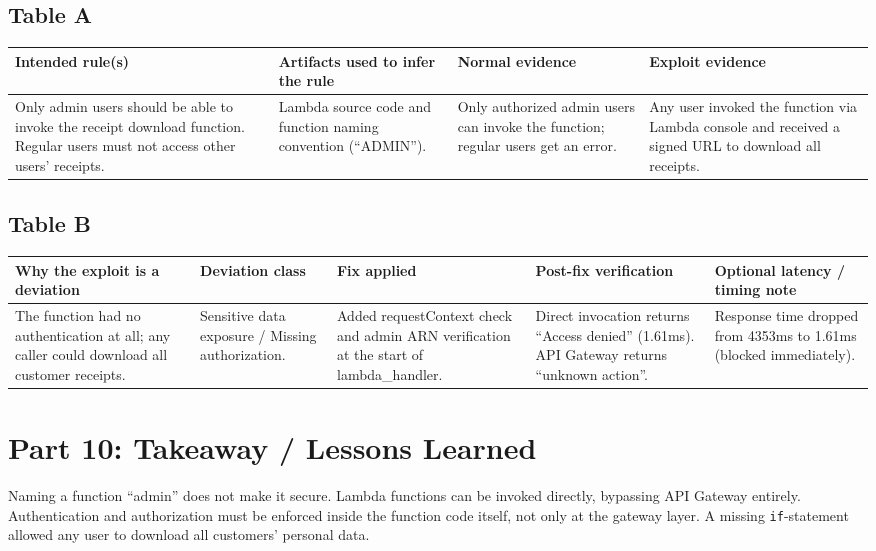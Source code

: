 \documentclass[12pt]{report}
\begin{document}
\subsection*{Table A}
\begin{table}[H]
  \small\centering
  \begin{tabularx}{\textwidth}{|Y|Y|Y|Y|}
    \hline
    \textbf{Intended rule(s)} & \textbf{Artifacts used to infer the rule} & \textbf{Normal evidence} & \textbf{Exploit evidence} \\
    \hline
    Only admin users should be able to invoke the receipt download function. Regular users must not access other users' receipts. &
    Lambda source code and function naming convention (``ADMIN''). &
    Only authorized admin users can invoke the function; regular users get an error. &
    Any user invoked the function via Lambda console and received a signed URL to download all receipts. \\
    \hline
  \end{tabularx}
\end{table}

\subsection*{Table B}
\begin{table}[H]
  \footnotesize
  \centering
  \begin{tabularx}{\textwidth}{|Y|Y|Y|Y|Y|}
    \hline
    \textbf{Why the exploit is a deviation} & \textbf{Deviation class} & \textbf{Fix applied} & \textbf{Post-fix verification} & \textbf{Optional latency / timing note} \\
    \hline
    The function had no authentication at all; any caller could download all customer receipts. &
    Sensitive data exposure / Missing authorization. &
    Added requestContext check and admin ARN verification at the start of lambda\_handler. &
    Direct invocation returns ``Access denied'' (1.61ms). API Gateway returns ``unknown action''. &
    Response time dropped from 4353ms to 1.61ms (blocked immediately). \\
    \hline
  \end{tabularx}
\end{table}

\section{Part 10: Takeaway / Lessons Learned}
Naming a function ``admin'' does not make it secure. Lambda functions can be invoked directly, bypassing API Gateway entirely. Authentication and authorization must be enforced inside the function code itself, not only at the gateway layer. A missing \texttt{if}-statement allowed any user to download all customers' personal data.
\end{document}
